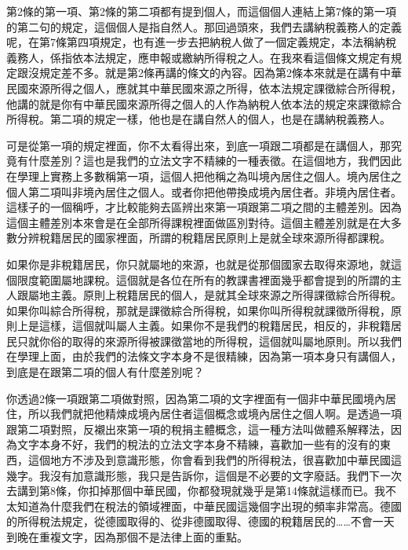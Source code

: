 \documentclass[oneside,sub3section]{ctexbook}
\begin{document}
第2條的第一項、第2條的第二項都有提到個人，而這個個人連結上第7條的第一項的第二句的規定，這個個人是指自然人。那回過頭來，我們去講納稅義務人的定義呢，在第7條第四項規定，也有進一步去把納稅人做了一個定義規定，本法稱納稅義務人，係指依本法規定，應申報或繳納所得稅之人。在我來看這個條文規定有規定跟沒規定差不多。就是第2條再講的條文的內容。因為第2條本來就是在講有中華民國來源所得之個人，應就其中華民國來源之所得，依本法規定課徵綜合所得稅，他講的就是你有中華民國來源所得之個人的人作為納稅人依本法的規定來課徵綜合所得稅。第二項的規定一樣，他也是在講自然人的個人，也是在講納稅義務人。

可是從第一項的規定裡面，你不太看得出來，到底一項跟二項都是在講個人，那究竟有什麼差別？這也是我們的立法文字不精練的一種表徵。在這個地方，我們因此在學理上實務上多數稱第一項，這個人把他稱之為叫境內居住之個人。境內居住之個人第二項叫非境內居住之個人。或者你把他帶換成境內居住者。非境內居住者。這樣子的一個稱呼，才比較能夠去區辨出來第一項跟第二項之間的主體差別。因為這個主體差別本來會是在全部所得課稅裡面做區別對待。這個主體差別就是在大多數分辨稅籍居民的國家裡面，所謂的稅籍居民原則上是就全球來源所得都課稅。

如果你是非稅籍居民，你只就屬地的來源，也就是從那個國家去取得來源地，就這個限度範圍屬地課稅。這個就是各位在所有的教課書裡面幾乎都會提到的所謂的主人跟屬地主義。原則上稅籍居民的個人，是就其全球來源之所得課徵綜合所得稅。如果你叫綜合所得稅，那就是課徵綜合所得稅，如果你叫所得稅就課徵所得稅，原則上是這樣，這個就叫屬人主義。如果你不是我們的稅籍居民，相反的，非稅籍居民只就你俗的取得的來源所得被課徵當地的所得稅，這個就叫屬地原則。所以我們在學理上面，由於我們的法條文字本身不是很精練，因為第一項本身只有講個人，到底是在跟第二項的個人有什麼差別呢？

你透過2條一項跟第二項做對照，因為第二項的文字裡面有一個非中華民國境內居住，所以我們就把他精煉成境內居住者這個概念或境內居住之個人啊。是透過一項跟第二項對照，反襯出來第一項的稅捐主體概念，這一種方法叫做體系解釋法，因為文字本身不好，我們的稅法的立法文字本身不精練，喜歡加一些有的沒有的東西，這個地方不涉及到意識形態，你會看到我們的所得稅法，很喜歡加中華民國這幾字。我沒有加意識形態，我只是告訴你，這個是不必要的文字廢話。我們下一次去講到第8條，你扣掉那個中華民國，你都發現就幾乎是第14條就這樣而已。我不太知道為什麼我們在稅法的領域裡面，中華民國這幾個字出現的頻率非常高。德國的所得稅法規定，從德國取得的、從非德國取得、德國的稅籍居民的\ldots\ldots 不會一天到晚在重複文字，因為那個不是法律上面的重點。
\end{document}
